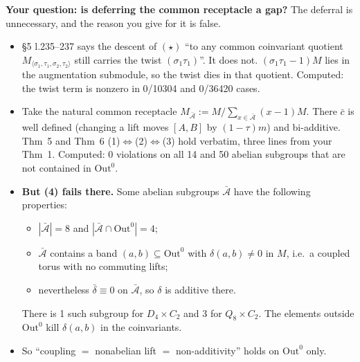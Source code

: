 \documentclass[10pt]{article}
\newcommand{\Out}{\mathrm{Out}}
\begin{document}
\textbf{Your question: is deferring the common receptacle a gap?} The deferral is unnecessary, and the reason you give for it is false.
\begin{itemize}
\item \S5 l.235--237 says the descent of $(\star)$ ``to any common coinvariant quotient $M_{\langle\sigma_1,\tau_1,\sigma_2,\tau_2\rangle}$ still carries the twist $(\sigma_1\tau_1)$''. It does not. $(\sigma_1\tau_1-1)M$ lies in the augmentation submodule, so the twist dies in that quotient. Computed: the twist term is nonzero in 0/10304 and 0/36420 cases.
\item Take the natural common receptacle $M_{\bar{\mathcal A}}:=M/\sum_{x\in\bar{\mathcal A}}(x-1)M$. There $\bar c$ is well defined (changing a lift moves $[A,B]$ by $(1-\tau)m$) and bi-additive. Thm~5 and Thm~6 (1)$\Leftrightarrow$(2)$\Leftrightarrow$(3) hold verbatim, three lines from your Thm~1. Computed: 0 violations on all 14 and 50 abelian subgroups that are not contained in $\Out^0$.
\item \textbf{But (4) fails there.} Some abelian subgroups $\bar{\mathcal A}$ have the following properties:
  \begin{itemize}
  \item $|\bar{\mathcal A}|=8$ and $|\bar{\mathcal A}\cap\Out^0|=4$;
  \item $\bar{\mathcal A}$ contains a band $(a,b)\subseteq\Out^0$ with $\delta(a,b)\ne0$ in $M$, i.e.\ a coupled torus with no commuting lifts;
  \item nevertheless $\bar\delta\equiv0$ on $\bar{\mathcal A}$, so $\delta$ is additive there.
  \end{itemize}
  There is 1 such subgroup for $D_4\times C_2$ and 3 for $Q_8\times C_2$. The elements outside $\Out^0$ kill $\delta(a,b)$ in the coinvariants.
\item So ``coupling $=$ nonabelian lift $=$ non-additivity'' holds on $\Out^0$ only.
\end{itemize}
\end{document}
